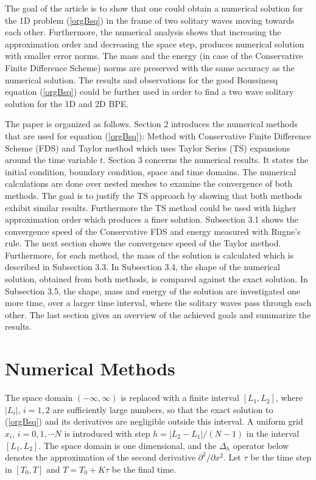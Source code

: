 \documentclass[%
 aip,
cp,  
 amsmath,amssymb,
 reprint,
]{iopconfser}
\newcommand{\rf}[1]{(\ref{#1})}
\begin{document}
The goal of the article is to show that one could obtain a numerical solution for the 1D problem \rf{orgBsq} in the frame of two solitary waves moving towards each other. Furthermore, the numerical analysis shows that increasing the approximation order and decreasing the space step, produces  numerical solution with smaller error norms. The mass and the energy (in case of the Conservative Finite Difference Scheme) norms are preserved with the same accuracy as the numerical solution. The results and observations for the good Boussinesq equation \rf{orgBsq} could be further used in order to find a two wave solitary solution for the 1D and 2D BPE.

The paper is organized as follows. Section 2 introduces the numerical methods that are used for equation \rf{orgBsq}: Method with Conservative Finite Difference Scheme (FDS) and Taylor method which uses Taylor Series (TS) expansions around the time variable $t$. Section 3 concerns the numerical results. It states the initial condition, boundary condition, space and time domains. The numerical calculations are done over nested meshes to examine the convergence of both methods. The goal is to justify the TS approach by showing that both methods exhibit similar results. Furthermore the TS method could be used with higher approximation order which produces a finer solution. Subsection 3.1 shows the convergence speed of the Conservative FDS and energy measured with Rugne's rule. The next section shows the convergence speed of the Taylor method. Furthermore, for each method, the mass of the solution is calculated which is described in Subsection 3.3. In Subsection 3.4, the shape of the numerical solution, obtained from both methods, is compared against the exact solution. In Subsection 3.5, the shape, mass and energy of the solution are investigated one more time, over a larger time interval, where the solitary waves pass through each other. The last section gives an overview of the achieved goals and summarize the results.

\section{Numerical Methods}

The space domain $(-\infty,\infty)$ is replaced with a finite  interval $[L_1,L_2]$, where $|L_i|$, $i=1,2$ are sufficiently large numbers, so that the exact solution to \rf{orgBsq} and its derivatives are negligible outside this interval. A uniform grid $x_i$,  $i=0,1,\cdots N$ is introduced with step $h=|L_2-L_1|/(N-1)$ in the interval $[L_1,L_2]$. The space domain is one dimensional, and the $\Delta_h$ operator below denotes the approximation of the second derivative $\partial^2/\partial x^2$.
Let $\tau$ be the time step in $[T_0,T]$ and $T=T_0+K \tau$ be the final time. 
\end{document}
